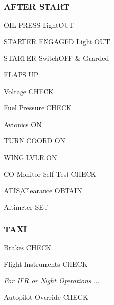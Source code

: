 \begin{multicols}{2}
\subsubsection*{AFTER START}
\begin{enumerate*}
\item OIL PRESS Light\dotfill OUT
\item STARTER ENGAGED Light \dotfill OUT
\item STARTER Switch\dotfill OFF \& Guarded
\item FLAPS \dotfill UP
\item Voltage \dotfill CHECK
\item Fuel Pressure \dotfill CHECK
\item Avionics \dotfill ON
\item TURN COORD \dotfill ON
\item WING LVLR \dotfill ON
\item CO Monitor Self Test \dotfill CHECK
\item ATIS/Clearance \dotfill OBTAIN
\item Altimeter \dotfill SET
\end{enumerate*}

\subsubsection*{TAXI}
\begin{enumerate*}
\item Brakes \dotfill CHECK
\item Flight Instruments \dotfill CHECK
\item \emph{For IFR or Night Operations ...}
\begin{itemize*}
\item Autopilot Override \dotfill CHECK
\end{itemize*}
\end{enumerate*}


\end{multicols}
